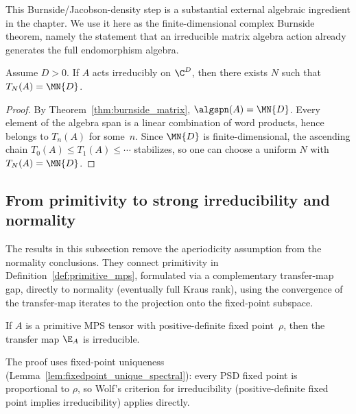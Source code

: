\begin{remark}\leanok
    This Burnside/Jacobson-density step is a substantial external algebraic
    ingredient in the chapter. We use it here as the finite-dimensional complex
    Burnside theorem, namely the statement that an irreducible matrix algebra
    action already generates the full endomorphism algebra.
\end{remark}

\begin{theorem}%
    \label{thm:irreducible_action_cumulative_span}
    \leanok
    Assume $D > 0$.
    If $A$ acts irreducibly on $\C^D$, then there exists $N$ such that
    $T_N(A) = \MN{D}$.
\end{theorem}

\begin{proof}\leanok{}
    By Theorem~\ref{thm:burnside_matrix}, $\algspn(A) = \MN{D}$.
    Every element of the algebra span is a linear combination of word products,
    hence belongs to $T_n(A)$ for some~$n$.
    Since $\MN{D}$ is finite-dimensional, the ascending chain
    $T_0(A) \le T_1(A) \le \cdots$ stabilizes, so one can choose a uniform
    $N$ with $T_N(A) = \MN{D}$.
\end{proof}


\subsection{From primitivity to strong irreducibility and normality}%
\label{subsec:prim_normality_connection}

The results in this subsection remove the aperiodicity assumption
from the normality conclusions.
They connect primitivity in Definition~\ref{def:primitive_mps},
formulated via a complementary transfer-map gap, directly to normality
(eventually full Kraus rank),
using the convergence of the transfer-map iterates to the
projection onto the fixed-point subspace.

\begin{lemma}%
    \label{lem:irreducible_map_from_primitive}
    \leanok
    If $A$ is a primitive MPS tensor with positive-definite fixed
    point~$\rho$, then the transfer map $\E_A$ is irreducible.

    The proof uses fixed-point uniqueness
    (Lemma~\ref{lem:fixedpoint_unique_spectral}):
    every PSD fixed point is proportional to $\rho$,
    so Wolf's criterion for irreducibility
    (positive-definite fixed point implies irreducibility)
    applies directly.
\end{lemma}

